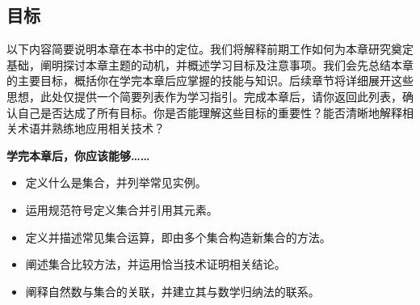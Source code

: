 \subsection{目标}

以下内容简要说明本章在本书中的定位。我们将解释前期工作如何为本章研究奠定基础，阐明探讨本章主题的动机，并概述学习目标及注意事项。我们会先总结本章的主要目标，概括你在学完本章后应掌握的技能与知识。后续章节将详细展开这些思想，此处仅提供一个简要列表作为学习指引。完成本章后，请你返回此列表，确认自己是否达成了所有目标。你是否能理解这些目标的重要性？能否清晰地解释相关术语并熟练地应用相关技术？

\textbf{学完本章后，你应该能够……}

\begin{itemize}
    \item 定义什么是集合，并列举常见实例。
    \item 运用规范符号定义集合并引用其元素。
    \item 定义并描述常见集合运算，即由多个集合构造新集合的方法。
    \item 阐述集合比较方法，并运用恰当技术证明相关结论。
    \item 阐释自然数与集合的关联，并建立其与数学归纳法的联系。
\end{itemize}
